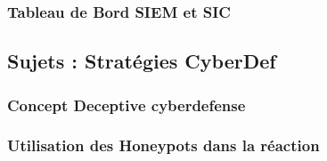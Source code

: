 \subsubsection{Tableau de Bord SIEM et SIC}


\subsection{Sujets : Stratégies CyberDef}
\subsubsection{Concept Deceptive cyberdefense}
\subsubsection{Utilisation des Honeypots dans la réaction }

